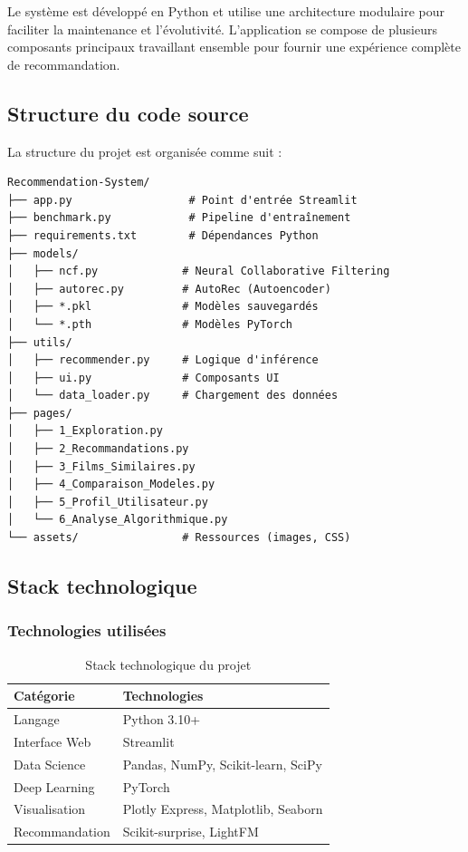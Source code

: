\documentclass[12pt,a4paper]{article}
\begin{document}
Le système est développé en Python et utilise une architecture modulaire pour faciliter la maintenance et l'évolutivité. L'application se compose de plusieurs composants principaux travaillant ensemble pour fournir une expérience complète de recommandation.

\subsection{Structure du code source}

La structure du projet est organisée comme suit :

\begin{lstlisting}[style=pythonstyle, caption=Structure du projet]
Recommendation-System/
├── app.py                  # Point d'entrée Streamlit
├── benchmark.py            # Pipeline d'entraînement
├── requirements.txt        # Dépendances Python
├── models/
│   ├── ncf.py             # Neural Collaborative Filtering
│   ├── autorec.py         # AutoRec (Autoencoder)
│   ├── *.pkl              # Modèles sauvegardés
│   └── *.pth              # Modèles PyTorch
├── utils/
│   ├── recommender.py     # Logique d'inférence
│   ├── ui.py              # Composants UI
│   └── data_loader.py     # Chargement des données
├── pages/
│   ├── 1_Exploration.py
│   ├── 2_Recommandations.py
│   ├── 3_Films_Similaires.py
│   ├── 4_Comparaison_Modeles.py
│   ├── 5_Profil_Utilisateur.py
│   └── 6_Analyse_Algorithmique.py
└── assets/                # Ressources (images, CSS)
\end{lstlisting}

\subsection{Stack technologique}

\subsubsection{Technologies utilisées}

\begin{table}[H]
\centering
\begin{tabular}{@{}ll@{}}
\toprule
\textbf{Catégorie} & \textbf{Technologies} \\ \midrule
Langage & Python 3.10+ \\
Interface Web & Streamlit \\
Data Science & Pandas, NumPy, Scikit-learn, SciPy \\
Deep Learning & PyTorch \\
Visualisation & Plotly Express, Matplotlib, Seaborn \\
Recommandation & Scikit-surprise, LightFM \\
\bottomrule
\end{tabular}
\caption{Stack technologique du projet}
\end{table}
\end{document}
